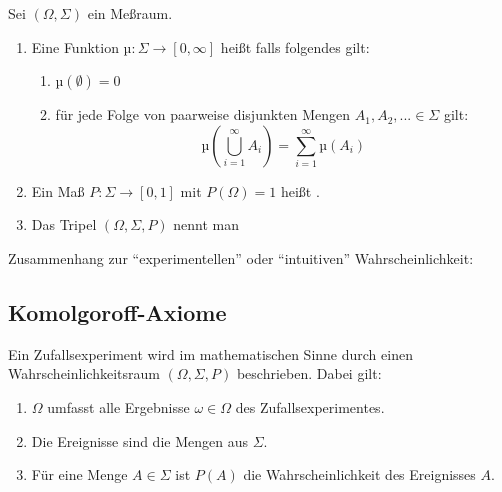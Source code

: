 \begin{definition} Sei $(\Omega,\Sigma)$ ein Meßraum.
\begin{enumerate}
 \item Eine Funktion $µ: \Sigma \rightarrow [0,\infty]$ heißt  falls folgendes gilt:
  \begin{enumerate}
   \item $µ(\emptyset) = 0$

   \item für jede Folge von paarweise disjunkten Mengen $A_1, A_2, ... \in \Sigma$ gilt:
$$ µ \left ( \bigcup_{i=1}^\infty A_i \right ) = \sum_{i=1}^\infty µ \left ( A_i \right ) $$
  \end{enumerate}
 \item Ein Maß $P: \Sigma \rightarrow [0,1]$ mit $P(\Omega) = 1$ heißt .
 \item Das Tripel $(\Omega,\Sigma,P)$ nennt man 
\end{enumerate}
\end{definition}

Zusammenhang zur ``experimentellen'' oder ``intuitiven'' Wahrscheinlichkeit:

\subsection{Komolgoroff-Axiome}
Ein Zufallsexperiment wird im mathematischen Sinne durch einen Wahrscheinlichkeitsraum $(\Omega,\Sigma,P)$ beschrieben. Dabei gilt:
\begin{enumerate}
 \item $\Omega$ umfasst alle Ergebnisse $\omega \in \Omega$ des Zufallsexperimentes.
 \item Die Ereignisse sind die Mengen aus $\Sigma$.
 \item Für eine Menge $A \in \Sigma$ ist $P(A)$ die Wahrscheinlichkeit des Ereignisses $A$.
\end{enumerate}

